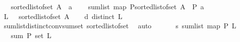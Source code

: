 \begin{isabellebody}
\ \ \ {\isacharparenleft}{\kern0pt}sorted{\isacharunderscore}{\kern0pt}list{\isacharunderscore}{\kern0pt}of{\isacharunderscore}{\kern0pt}set\ {\isacharparenleft}{\kern0pt}A\ {\isacharminus}{\kern0pt}\ {\isacharbraceleft}{\kern0pt}a{\isacharbraceright}{\kern0pt}{\isacharparenright}{\kern0pt}{\isacharparenright}{\kern0pt}{\isacharparenright}{\kern0pt}\ \isanewline
\ \ {\isacharequal}{\kern0pt}\ sum{\isacharunderscore}{\kern0pt}list\ {\isacharparenleft}{\kern0pt}{\isacharparenleft}{\kern0pt}map\ P{\isacharparenright}{\kern0pt}{\isacharparenleft}{\kern0pt}sorted{\isacharunderscore}{\kern0pt}list{\isacharunderscore}{\kern0pt}of{\isacharunderscore}{\kern0pt}set\ {\isacharparenleft}{\kern0pt}A{\isacharparenright}{\kern0pt}{\isacharparenright}{\kern0pt}{\isacharparenright}{\kern0pt}\ {\isacharminus}{\kern0pt}\ {\isacharparenleft}{\kern0pt}P\ a{\isacharparenright}{\kern0pt}{\isachardoublequoteclose}\isanewline
%
\isadelimproof
%
\endisadelimproof
%
\isatagproof
{}\isamarkupfalse%
\ {\isacharminus}{\kern0pt}\isanewline
\ \ \isamarkupfalse%
\ {\isacharquery}{\kern0pt}L{}\ {\isacharequal}{\kern0pt}\ \ {\isachardoublequoteopen}{\isacharparenleft}{\kern0pt}sorted{\isacharunderscore}{\kern0pt}list{\isacharunderscore}{\kern0pt}of{\isacharunderscore}{\kern0pt}set\ {\isacharparenleft}{\kern0pt}A{\isacharparenright}{\kern0pt}{\isacharparenright}{\kern0pt}{\isachardoublequoteclose}\isanewline
\ \ \isamarkupfalse%
\ d{\isacharunderscore}{\kern0pt}{}{\isacharcolon}{\kern0pt}\ {\isachardoublequoteopen}distinct\ {\isacharquery}{\kern0pt}L{}{\isachardoublequoteclose}\ \isamarkupfalse%
\ sum{\isacharunderscore}{\kern0pt}list{\isacharunderscore}{\kern0pt}distinct{\isacharunderscore}{\kern0pt}conv{\isacharunderscore}{\kern0pt}sum{\isacharunderscore}{\kern0pt}set\ sorted{\isacharunderscore}{\kern0pt}list{\isacharunderscore}{\kern0pt}of{\isacharunderscore}{\kern0pt}set{\isacharparenleft}{\kern0pt}{}{\isacharparenright}{\kern0pt}\ \isamarkupfalse%
\ auto\isanewline
\ \ \ \isamarkupfalse%
\ \isamarkupfalse%
\ s{\isacharunderscore}{\kern0pt}{}{\isacharcolon}{\kern0pt}\ {\isachardoublequoteopen}sum{\isacharunderscore}{\kern0pt}list\ {\isacharparenleft}{\kern0pt}{\isacharparenleft}{\kern0pt}map\ P{\isacharparenright}{\kern0pt}\ {\isacharquery}{\kern0pt}L{}{\isacharparenright}{\kern0pt}\ \isanewline
\ \ {\isacharequal}{\kern0pt}\ sum\ P\ {\isacharparenleft}{\kern0pt}set\ {\isacharquery}{\kern0pt}L{}{\isacharparenright}{\kern0pt}{\isachardoublequoteclose}\ \isamarkupfalse%

\end{isabellebody}
